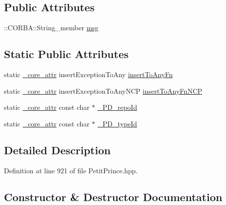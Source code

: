 \subsection*{Public Attributes}
\begin{DoxyCompactItemize}
\item 
\+::C\+O\+R\+B\+A\+::\+String\+\_\+member \hyperlink{class_draw_service_1_1_non_applicable_a80d5412b7ad22c14c85808108d88e6c8}{msg}
\end{DoxyCompactItemize}
\subsection*{Static Public Attributes}
\begin{DoxyCompactItemize}
\item 
static \hyperlink{_petit_prince_8hpp_a5f7bf7cddb608c2aad7c95f55f8a33c5}{\+\_\+core\+\_\+attr} insert\+Exception\+To\+Any \hyperlink{class_draw_service_1_1_non_applicable_a3d81026fedf74a52030527292e782f64}{insert\+To\+Any\+Fn}
\item 
static \hyperlink{_petit_prince_8hpp_a5f7bf7cddb608c2aad7c95f55f8a33c5}{\+\_\+core\+\_\+attr} insert\+Exception\+To\+Any\+N\+CP \hyperlink{class_draw_service_1_1_non_applicable_a1616cdc51c85c7a0b695c5977cd7ef2e}{insert\+To\+Any\+Fn\+N\+CP}
\item 
static \hyperlink{_petit_prince_8hpp_a5f7bf7cddb608c2aad7c95f55f8a33c5}{\+\_\+core\+\_\+attr} const char $\ast$ \hyperlink{class_draw_service_1_1_non_applicable_a015185b7b1da779a5bc357a3a0a915fb}{\+\_\+\+P\+D\+\_\+repo\+Id}
\item 
static \hyperlink{_petit_prince_8hpp_a5f7bf7cddb608c2aad7c95f55f8a33c5}{\+\_\+core\+\_\+attr} const char $\ast$ \hyperlink{class_draw_service_1_1_non_applicable_a9d41d76560094a36ed0cc1800382f950}{\+\_\+\+P\+D\+\_\+type\+Id}
\end{DoxyCompactItemize}


\subsection{Detailed Description}


Definition at line 921 of file Petit\+Prince.\+hpp.



\subsection{Constructor \& Destructor Documentation}
